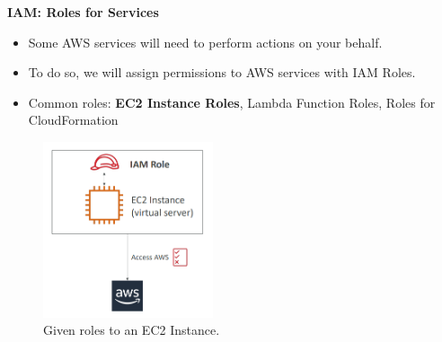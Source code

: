 \documentclass{article}
\begin{document}
\textbf{IAM: Roles for Services}\par
\begin{itemize}
    \item Some AWS services will need to perform actions on your behalf.
    \item To do so, we will assign permissions to AWS services with IAM Roles.
    \item Common roles: \textbf{EC2 Instance Roles}, Lambda Function Roles, Roles for CloudFormation 
\end{itemize}

\begin{figure}[h]
    \centering
    \includegraphics[width = 5cm]{Pictures/Theory/IAM_Roles.png}
    \caption{Given roles to an EC2 Instance.}
    \label{fig:enter-label}
\end{figure}
\newpage
\end{document}
